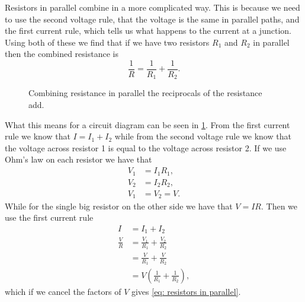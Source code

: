 \documentclass[a4paper,12pt]{book}
\begin{document}
Resistors in parallel combine in a more complicated way. This is because we need to use the second voltage rule, that the voltage is the same in parallel paths, and the first current rule, which tells us what happens to the current at a junction. Using both of these we find that if we have two resistors $R_{1}$ and $R_{2}$ in parallel then the combined resistance is
\begin{equation}
\frac{1}{R}=\frac{1}{R_{1}}+\frac{1}{R_{2}}.
\label{eq: resistors in parallel}
\end{equation}

  \begin{figure}[ht]
    \centering
    \caption{Combining resistance in parallel the reciprocals of the resistance add.}
    \label{fig: resistors in parallel}
\end{figure}

What this means for a circuit diagram can be seen in \cref{fig: resistors in parallel}.  From the first current rule we know that $I=I_{1}+I_{2}$ while from the second voltage rule we know that the voltage across resistor 1 is equal to the voltage across resistor 2. If we use Ohm's law on each resistor we have that 
\begin{align*}
V_{1}&=I_{1} R_{1},\\
V_{2}&=I_{2} R_{2},\\
V_{1}&=V_{2}=V.
\end{align*}
While for the single big resistor on the other side we have that $V=IR$.  Then we use the first current rule 
\begin{align*}
I&=I_{1}+I_{2}\\
\frac{V}{R}&=\frac{V_{1}}{R_{1}}+\frac{V_{2}}{R_{2}}\\
&=\frac{V}{R_{1}}+\frac{V}{R_{2}}\\
&=V\left(\frac{1}{R_{1}}+\frac{1}{R_{2}}\right),
\end{align*}
which if we cancel the factors of $V$ gives \cref{eq: resistors in parallel}.
\end{document}

